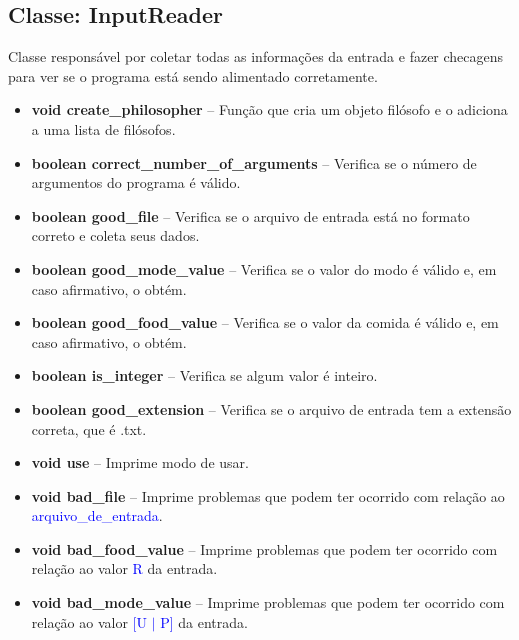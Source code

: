 \documentclass[11pt]{article}
\begin{document}
\subsection{Classe: InputReader}
Classe responsável por coletar todas as informações da entrada e fazer checagens para ver se o programa está sendo alimentado corretamente. 
\begin{itemize}
	\item \textbf{\textcolor{sblue}{void} create\_philosopher} -- Função que cria um objeto filósofo e o adiciona a uma lista de filósofos.
	\item \textbf{\textcolor{sblue}{boolean} correct\_number\_of\_arguments} -- Verifica se o número de argumentos do programa é válido.
	\item \textbf{\textcolor{sblue}{boolean} good\_file} -- Verifica se o arquivo de entrada está no formato correto e coleta seus dados.
	\item \textbf{\textcolor{sblue}{boolean} good\_mode\_value} -- Verifica se o valor do modo é válido e, em caso afirmativo, o obtém.
	\item \textbf{\textcolor{sblue}{boolean} good\_food\_value} -- Verifica se o valor da comida é válido e, em caso afirmativo, o obtém.
	\item \textbf{\textcolor{sblue}{boolean} is\_integer} -- Verifica se algum valor é inteiro.
	\item \textbf{\textcolor{sblue}{boolean} good\_extension} -- Verifica se o arquivo de entrada tem a extensão correta, que é .txt.
	\item \textbf{\textcolor{sblue}{void} use} -- Imprime modo de usar.
	\item \textbf{\textcolor{sblue}{void} bad\_file} -- Imprime problemas que podem ter ocorrido com relação ao \textcolor{blue}{arquivo\_de\_entrada}.
	\item \textbf{\textcolor{sblue}{void} bad\_food\_value} -- Imprime problemas que podem ter ocorrido com relação ao valor \textcolor{blue}{R} da entrada.
	\item \textbf{\textcolor{sblue}{void} bad\_mode\_value} -- Imprime problemas que podem ter ocorrido com relação ao valor \textcolor{blue}{[U $|$ P]} da entrada.
\end{itemize}
\end{document}
